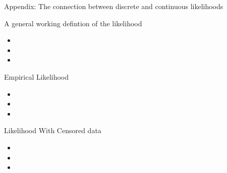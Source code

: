 \documentclass{beamer}
\begin{document}
\begin{section}{Appendix: The connection between discrete and continuous likelihoods}  

    \begin{frame}{A general working defintion of the likelihood}
        \begin{itemize}
            \item
            \item
            \item 
        \end{itemize}
    \end{frame}

    \begin{frame}{Empirical Likelihood}
        \begin{itemize}
            \item
            \item
            \item  
        \end{itemize}
    \end{frame}

    \begin{frame}{Likelihood With Censored data}
        \begin{itemize}
            \item
            \item
            \item  
        \end{itemize}
    \end{frame}

\end{section}
\end{document}
